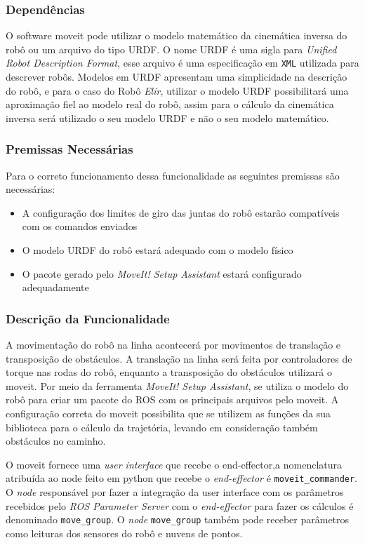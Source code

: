 \subsubsection{Dependências}
O software moveit pode utilizar o modelo matemático da cinemática inversa do robô ou um arquivo do tipo URDF.
O nome URDF é uma sigla para \textit{Unified Robot Description Format}, esse arquivo é uma especificação em \verb|XML| utilizada para descrever robôs. Modelos em URDF apresentam uma simplicidade na descrição do robô, e para o caso do Robô \textit{Elir}, utilizar o modelo URDF possibilitará uma aproximação fiel ao modelo real do robô, assim para o cálculo da cinemática inversa será utilizado o seu modelo URDF e não o seu modelo matemático.

\subsubsection{Premissas Necessárias}
Para o correto funcionamento dessa funcionalidade as seguintes premissas são necessárias:
\begin{itemize}
	\item A configuração dos limites de giro das juntas do robô estarão compatíveis com os comandos enviados
	\item O modelo URDF do robô estará adequado com o modelo físico
	\item O pacote gerado pelo \textit{MoveIt! Setup Assistant} estará configurado adequadamente
\end{itemize}
\subsubsection{Descrição da Funcionalidade}
A movimentação do robô na linha acontecerá por movimentos de translação e transposição de obstáculos. A translação na linha será feita por controladores de torque nas rodas do robô, enquanto a transposição do obstáculos utilizará o moveit.
Por meio da ferramenta \textit{MoveIt! Setup Assistant}, se utiliza o modelo do robô para criar um pacote do ROS com os principais arquivos pelo moveit. 
A configuração correta do moveit possibilita que se utilizem as funções da sua biblioteca para o cálculo da trajetória, levando em consideração também obstáculos no caminho.

O moveit fornece uma \textit{user interface} que recebe o end-effector,a nomenclatura atribuída ao node feito em python que recebe o \textit{end-effector} é \verb|moveit_commander|. O  \textit{node} responsável por fazer a integração da user interface com os parâmetros recebidos pelo \textit{ROS Parameter Server} com o \textit{end-effector} para fazer os cálculos é denominado \verb|move_group|. O \textit{node} \verb|move_group| também pode receber parâmetros como leituras dos sensores do robô e nuvens de pontos.

